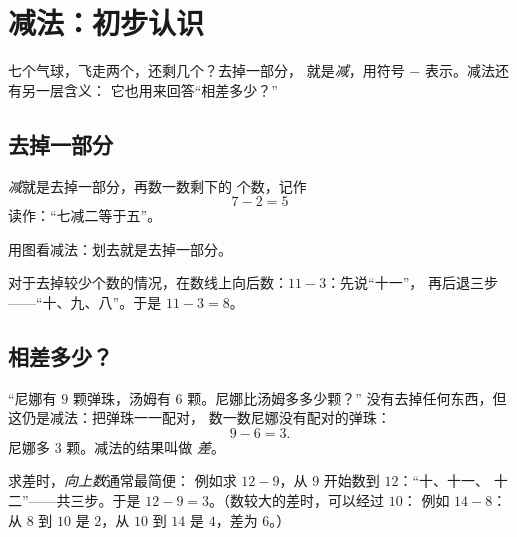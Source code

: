\chapter{减法：初步认识}\label{ch:g1:subtraction}

七个气球，飞走两个，还剩几个？去掉一部分，
就是\emph{减}，用符号 $-$ 表示。减法还有另一层含义：
它也用来回答“相差多少？”

\section{去掉一部分}

\begin{definition}[减法]\label{def:g1:subtraction:def}
\emph{减}就是去掉一部分，再数一数剩下的
个数，记作
\[
7 - 2 = 5
\]
读作：“七减二等于五”。
\end{definition}

\begin{omfigure}

{\small 用图看减法：划去就是去掉一部分。}
\end{omfigure}

\begin{example}[向后数]\label{ex:g1:subtraction:countback}
对于去掉较少个数的情况，在数线上向后数：$11 - 3$：先说“十一”，
再后退三步——“十、九、八”。于是
$11 - 3 = 8$。
\end{example}

\section{相差多少？}

\begin{example}[求差]\label{ex:g1:subtraction:difference}
“尼娜有 $9$ 颗弹珠，汤姆有 $6$ 颗。尼娜比汤姆多多少颗？”
没有去掉任何东西，但这仍是减法：把弹珠一一配对，
数一数尼娜没有配对的弹珠：
\[
9 - 6 = 3 .
\]
尼娜多 $3$ 颗。减法的结果叫做
\emph{差}。
\end{example}

\begin{method}[向上数]\label{met:g1:subtraction:countup}
求差时，\emph{向上数}通常最简便：
例如求 $12 - 9$，从 $9$ 开始数到 $12$：“十、十一、
十二”——共三步。于是 $12 - 9 = 3$。（数较大的差时，可以经过 $10$：
例如 $14 - 8$：从 $8$ 到 $10$ 是 $2$，从 $10$ 到 $14$
是 $4$，差为 $6$。）
\end{method}

